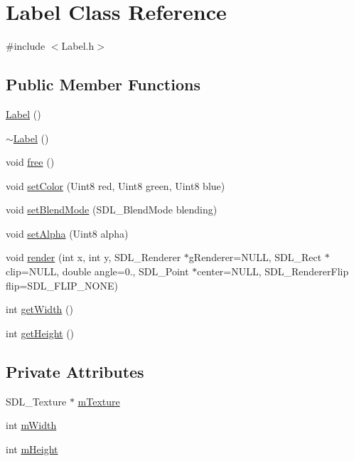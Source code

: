 \hypertarget{class_label}{}\section{Label Class Reference}
\label{class_label}


{\ttfamily \#include $<$Label.\+h$>$}

\subsection*{Public Member Functions}
\begin{DoxyCompactItemize}
\item 
\mbox{\hyperlink{class_label_af8f2bccf9faadcb2ca964bd2347dde24}{Label}} ()
\item 
\mbox{\hyperlink{class_label_a39e1167a9b5827afd888780973d88894}{$\sim$\+Label}} ()
\item 
void \mbox{\hyperlink{class_label_a553b973908f7b55a8feb671e9e1905bd}{free}} ()
\item 
void \mbox{\hyperlink{class_label_a647f75ec885d3c01a004a90ab169ade2}{set\+Color}} (Uint8 red, Uint8 green, Uint8 blue)
\item 
void \mbox{\hyperlink{class_label_a8cd51c7b2583a403790115a91f44a039}{set\+Blend\+Mode}} (S\+D\+L\+\_\+\+Blend\+Mode blending)
\item 
void \mbox{\hyperlink{class_label_a85c60678cb68784d27403bb552ef5447}{set\+Alpha}} (Uint8 alpha)
\item 
void \mbox{\hyperlink{class_label_a2288557e88819810b73d4fed4791f0e9}{render}} (int x, int y, S\+D\+L\+\_\+\+Renderer $\ast$g\+Renderer=N\+U\+LL, S\+D\+L\+\_\+\+Rect $\ast$clip=N\+U\+LL, double angle=0., S\+D\+L\+\_\+\+Point $\ast$center=N\+U\+LL, S\+D\+L\+\_\+\+Renderer\+Flip flip=S\+D\+L\+\_\+\+F\+L\+I\+P\+\_\+\+N\+O\+NE)
\item 
int \mbox{\hyperlink{class_label_aa7686dcb66482c219458280ce0daede0}{get\+Width}} ()
\item 
int \mbox{\hyperlink{class_label_a2493f06ab82ced2ebe627556e630fa5b}{get\+Height}} ()
\end{DoxyCompactItemize}
\subsection*{Private Attributes}
\begin{DoxyCompactItemize}
\item 
S\+D\+L\+\_\+\+Texture $\ast$ \mbox{\hyperlink{class_label_aa95ec4d816146a95690b2d4c1bddc7d5}{m\+Texture}}
\item 
int \mbox{\hyperlink{class_label_a1e3446cc442a467c36ed539a2e4184a0}{m\+Width}}
\item 
int \mbox{\hyperlink{class_label_a5436ac2014bcb2f0ab05729f6c642b45}{m\+Height}}
\end{DoxyCompactItemize}


